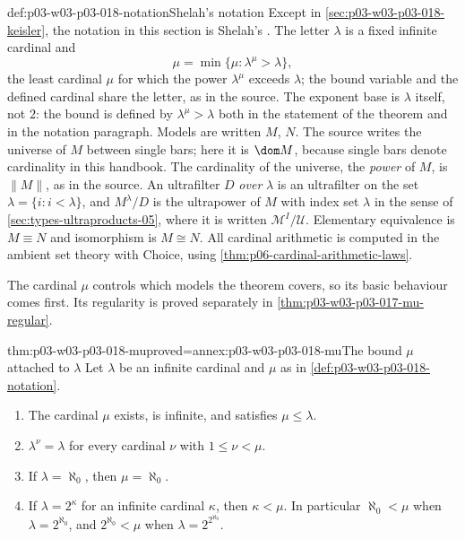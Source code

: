 \begin{hbconvention}{def:p03-w03-p03-018-notation}{Shelah's notation}
Except in \cref{sec:p03-w03-p03-018-keisler}, the notation in this section
is Shelah's
\cite[225]{Shelah1971Ultrapowers}.  The letter \(\lambda\) is a fixed
infinite cardinal and
\[
  \mu=\min\{\mu:\lambda^\mu>\lambda\},
\]
the least cardinal \(\mu\) for which the power \(\lambda^\mu\) exceeds
\(\lambda\); the bound variable and the defined cardinal share the letter, as
in the source.  The exponent base is \(\lambda\) itself, not \(2\): the bound
is defined by \(\lambda^\mu>\lambda\) both in the statement of the theorem
\cite[224]{Shelah1971Ultrapowers} and in the notation paragraph.
Models are written \(M\), \(N\).  The source writes the universe of \(M\)
between single bars; here it is \(\dom M\), because single bars denote
cardinality in this handbook.  The cardinality of the universe, the
\emph{power} of \(M\), is \(\lVert M\rVert\), as in the source.  An
ultrafilter \(D\) \emph{over} \(\lambda\) is an ultrafilter on the set
\(\lambda=\{i:i<\lambda\}\), and \(M^\lambda/D\) is the ultrapower of \(M\)
with index set \(\lambda\) in the sense of \cref{sec:types-ultraproducts-05},
where it is written \(\mathcal M^I/\mathcal U\).  Elementary equivalence is
\(M\equiv N\) and isomorphism is \(M\cong N\).  All cardinal arithmetic is
computed in the ambient set theory with Choice, using
\cref{thm:p06-cardinal-arithmetic-laws}.
\end{hbconvention}

The cardinal \(\mu\) controls which models the theorem covers, so its basic
behaviour comes first. Its regularity is proved separately in
\cref{thm:p03-w03-p03-017-mu-regular}.

\begin{hblemma}{thm:p03-w03-p03-018-mu}{proved=annex:p03-w03-p03-018-mu}{The bound \(\mu\) attached to \(\lambda\)}
Let \(\lambda\) be an infinite cardinal and \(\mu\) as in
\cref{def:p03-w03-p03-018-notation}.
\begin{enumerate}
  \item The cardinal \(\mu\) exists, is infinite, and satisfies
        \(\mu\le\lambda\).
  \item \(\lambda^\nu=\lambda\) for every cardinal \(\nu\) with
        \(1\le\nu<\mu\).
  \item If \(\lambda=\aleph_0\), then \(\mu=\aleph_0\).
  \item If \(\lambda=2^\kappa\) for an infinite cardinal \(\kappa\), then
        \(\kappa<\mu\).  In particular \(\aleph_0<\mu\) when
        \(\lambda=2^{\aleph_0}\), and \(2^{\aleph_0}<\mu\) when
        \(\lambda=2^{2^{\aleph_0}}\).
\end{enumerate}
\end{hblemma}

